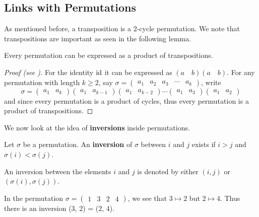 \subsection{Links with Permutations}
As mentioned before, a transposition is a 2-cycle permutation. We note that transpositions are important as seen in the following lemma.
\begin{lemma}\label{lemma-permutations-as-product-of-transpositions}
    Every permutation can be expressed as a product of transpositions.
\end{lemma}
\begin{proof}[Proof (see {\cite[\S 80 Corollary]{clark_1984}})]
    For the identity $\mathrm{id}$ it can be expressed as $(a\quad b)(a \quad b)$. For any permutation with length $k \geq 2$, say $\sigma = \begin{pmatrix}a_1 & a_2 & a_3 & \cdots & a_k\end{pmatrix}$, write
    \[
        \sigma = \begin{pmatrix}a_1 & a_k\end{pmatrix}\begin{pmatrix}a_1 & a_{k-1}\end{pmatrix}\begin{pmatrix}a_1 & a_{k-2}\end{pmatrix}\cdots\begin{pmatrix}a_1 & a_3\end{pmatrix}\begin{pmatrix}a_1 & a_2\end{pmatrix}
    \]
    and since every permutation is a product of cycles, thus every permutation is a product of transpositions.
\end{proof}

We now look at the idea of \textbf{inversions} inside permutations.
\begin{definition}
    Let $\sigma$ be a permutation. An \textbf{inversion} of $\sigma$ between $i$ and $j$ exists if $i > j$ and $\sigma(i) < \sigma(j)$.
\end{definition}
An inversion between the elements $i$ and $j$ is denoted by either $(i, j)$ or $(\sigma(i), \sigma(j))$.
\begin{example}
    In the permutation $\sigma = \begin{pmatrix}1 & 3 & 2 & 4\end{pmatrix}$, we see that $3 \mapsto 2$ but $2 \mapsto 4$. Thus there is an inversion (3, 2) = (2, 4).
\end{example}

